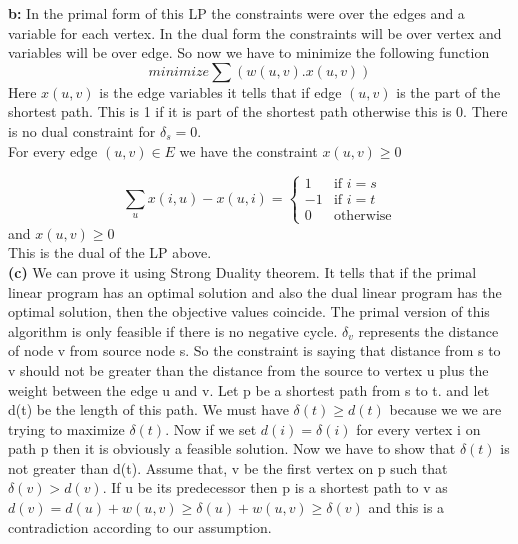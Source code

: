 \textbf{b:}
In the primal form of this LP the constraints were over the edges and a variable for each vertex. In the dual form the constraints will be over vertex and variables will be over edge. 
So now we have to minimize the following function
\[minimize \sum(w(u,v).x(u,v))\] 
Here $x(u,v)$ is the edge variables it tells that if edge $(u,v)$ is the part of the shortest path. This is 1 if it is part of the shortest path otherwise this is 0. There is no dual constraint for $\delta_s=0$. \\
For every edge $(u,v) \in E$  we have the constraint $x(u,v) \geq 0$ \\
\begin{comment}
Finally, the coefficients of the dual objective vector are the edge lengths, and the coefficients of the dual offset vector are +1 for t and 0 for every other vertex.So the constraints are
\[\sum_ux(u,t)-\sum_wx(t,w)=1\]
\[\sum_ux(u,v)-\sum_wx(v,w)=0\] for every vertex $v \ne s,t$(for the equation above, bad at latex) and 
\[x(u,v) \geq 0\]
\end{comment}
\begin{equation}
    \sum_u x(i,u)- x(u,i)=
    \begin{cases}
        1 & \text{if $i=s$ }\\
        -1 & \text{if $i=t$}\\
        0 & \text{otherwise}
    \end{cases}
\end{equation}
and $x(u,v) \geq 0$ \\
This is the dual of the LP above.\\
\textbf{(c)}
We can prove it using Strong Duality theorem. It tells that if the primal linear program has an optimal solution and also the dual linear program has the optimal solution, then the objective values coincide. 
The primal version of this algorithm is only feasible if there is no negative cycle. $\delta_v$ represents the distance of node v from source node s. So the constraint is saying that distance from s to v should not be greater than the distance from the source to vertex u plus the weight between the edge u and v. Let p be a shortest path from s to t. and let d(t) be the length of this path. We must have $\delta(t)\geq d(t)$ because we we are trying to maximize $\delta(t)$. Now if we set $d(i)=\delta(i)$ for every vertex i on path p then it is obviously a feasible solution. Now we have to show that $\delta(t) $ is not greater than d(t). Assume  that, v be the first vertex on p such that $\delta(v)>d(v)$. If u be its predecessor then p is a shortest path to v as $d(v)=d(u)+w(u,v)\geq\delta(u)+w(u,v)\geq\delta(v)$ and this is a contradiction according to our assumption. \\
